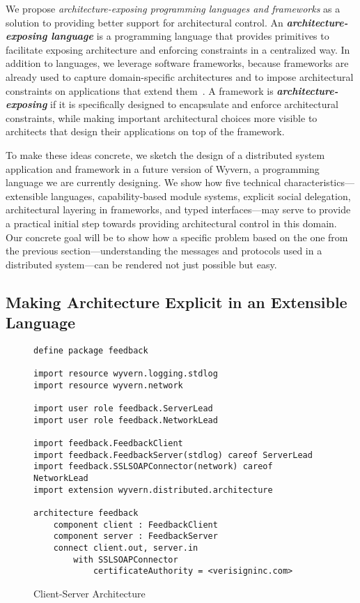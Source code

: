 \documentclass[runningheads]{llncs}
\begin{document}
\begin{sloppypar}
We propose \emph{architecture-exposing programming languages and frameworks} as a solution to providing better support for architectural control.  An \textit{\textbf{architecture-exposing language}} is a programming language that provides primitives to facilitate exposing architecture and enforcing constraints in a centralized way.  In addition to languages, we leverage software frameworks, because frameworks are already used to capture domain-specific architectures and to impose architectural constraints on applications that extend them~\cite{JaspanThesis}.  A framework is \emph{\textbf{architecture-exposing}} if it is specifically designed to encapsulate and enforce architectural constraints, while making important architectural choices more visible to architects that design their applications on top of the framework.

To make these ideas concrete, we sketch the design of a distributed system application and framework in a future version of Wyvern, a programming language we are currently designing.  We show how five technical characteristics---extensible languages, capability-based module systems, explicit social delegation, architectural layering in frameworks, and typed interfaces---may serve to provide a practical initial step towards providing architectural control in this domain.  Our concrete goal will be to show how a specific problem based on the one from the previous section---understanding the messages and protocols used in a distributed system---can be rendered not just possible but easy.


\subsection{Making Architecture Explicit in an Extensible Language}

   
\begin{figure}[t]
\begin{lstlisting}
define package feedback

import resource wyvern.logging.stdlog
import resource wyvern.network

import user role feedback.ServerLead
import user role feedback.NetworkLead

import feedback.FeedbackClient
import feedback.FeedbackServer(stdlog) careof ServerLead
import feedback.SSLSOAPConnector(network) careof NetworkLead
import extension wyvern.distributed.architecture

architecture feedback
    component client : FeedbackClient
    component server : FeedbackServer
    connect client.out, server.in
        with SSLSOAPConnector
            certificateAuthority = <verisigninc.com>
\end{lstlisting}
\caption{Client-Server Architecture}
\label{f-architecture}
\end{figure}


\end{sloppypar}
\end{document}
